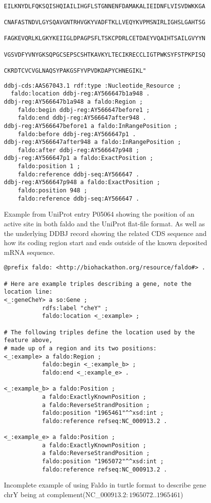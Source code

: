 \begin{figure}
\begin{shaded}
\begin{verbatim}
                     EILKNYDLFQKSQISHQIAILIHGFLSTGNNENFDAMAKALIEIDNFLVISVDWKKGA
                     CNAFASTNDVLGYSQAVGNTRHVGKYVADFTKLLVEQYKVPMSNIRLIGHSLGAHTSG
                     FAGKEVQRLKLGKYKEIIGLDPAGPSFLTSKCPDRLCETDAEYVQAIHTSAILGVYYN
                     VGSVDFYVNYGKSQPGCSEPSCSHTKAVKYLTECIKRECCLIGTPWKSYFSTPKPISQ
                     CKRDTCVCVGLNAQSYPAKGSFYVPVDKDAPYCHNEGIKL"
\end{verbatim}
\begin{verbatim}
ddbj-cds:AAS67043.1 rdf:type :Nucleotide_Resource ;
  faldo:location ddbj-reg:AY566647b1a948 .
ddbj-reg:AY566647b1a948 a faldo:Region ;
	faldo:begin ddbj-reg:AY566647before1 ;
	faldo:end ddbj-reg:AY566647after948 .
ddbj-reg:AY566647before1 a faldo:InRangePosition ;
	faldo:before ddbj-reg:AY566647p1 .
ddbj-reg:AY566647after948 a faldo:InRangePosition ;
	faldo:after ddbj-reg:AY566647p948 ;
ddbj-reg:AY566647p1	a faldo:ExactPosition ;
	faldo:position 1 ;
	faldo:reference ddbj-seq:AY566647 .
ddbj-reg:AY566647p948 a faldo:ExactPosition ;
	faldo:position 948 ;
	faldo:reference ddbj-seq:AY566647 .
\end{verbatim}
\end{shaded}
\caption{Example from UniProt entry P05064 showing the position of an active site in both faldo and the UniProt flat-file format. As well as the underlying DDBJ record showing the related CDS sequence and how its coding region start and ends outside of the known deposited mRNA sequence.}
\label{fig:UniProtDDBJ}
\end{figure}



%
\begin{figure}
\begin{shaded}
\small
\begin{verbatim} 
@prefix faldo: <http://biohackathon.org/resource/faldo#> .

# Here are example triples describing a gene, note the location line:
<_:geneCheY> a so:Gene ;
           rdfs:label "cheY" ;
           faldo:location <_:example> ;

# The following triples define the location used by the feature above,
# made up of a region and its two positions:
<_:example> a faldo:Region ;
           faldo:begin <_:example_b> ;
           faldo:end <_:example_e> .

<_:example_b> a faldo:Position ; 
           a faldo:ExactlyKnownPosition ;
           a faldo:ReverseStrandPosition ;
           faldo:position "1965461"^^xsd:int ;
           faldo:reference refseq:NC_000913.2 .

<_:example_e> a faldo:Position ; 
           a faldo:ExactlyKnownPosition ;
           a faldo:ReverseStrandPosition ;
           faldo:position "1965072"^^xsd:int ;
           faldo:reference refseq:NC_000913.2 .
\end{verbatim}
\end{shaded}
\caption{Incomplete example of using Faldo in turtle format to describe
gene chrY being at complement(NC\_$000913.2:1965072..1965461$)}
\label{fig:insdcComplement}
\end{figure}


